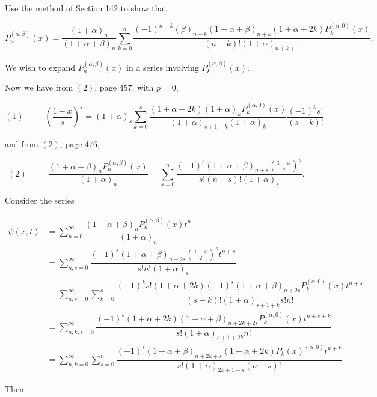 \begin{problem}\label{problem5chapter16}
Use the method of Section 142 to show that

$$P_n^{(\alpha,\beta)}(x) = \dfrac{(1+\alpha)_n}{(1+\alpha+\beta)_n} \displaystyle\sum_{k=0}^n \dfrac{(-1)^{n-k}(\beta)_{n-k}(1+\alpha+\beta)_{n+k}(1+\alpha+2k)P_k^{(\alpha,0)}(x)}{(n-k)! (1+\alpha)_{n+k+1}}.$$
\end{problem}
\begin{solution}
We wish to expand $P_n^{(\alpha,\beta)}(x)$ in a series involving $P_k^{(\alpha,\beta)}(x).$

Now we have from $(2)$, page 457, with $p=0$,

$$(1) \hspace{30pt} \left( \dfrac{1-x}{s} \right)^s = (1+\alpha)_s \displaystyle\sum_{k=0}^s \dfrac{(1+\alpha+2k)(1+\alpha)_k P_k^{(\alpha,0)}(x)}{(1+\alpha)_{s+1+k} (1+\alpha)_k} \dfrac{(-1)^k s!}{(s-k)!}$$

and from $(2)$, page 476,

$$(2) \hspace{30pt} \dfrac{(1+\alpha+\beta)_n P_n^{(\alpha,\beta)}(x)}{(1+\alpha)_n} = \displaystyle\sum_{s=0}^n \dfrac{(-1)^s (1+\alpha+\beta)_{n+s} (\frac{1-x}{s})^s}{s! (n-s)! (1+\alpha)_s}.$$

Consider the series

$$\begin{array}{ll}
\psi(x,t) &= \displaystyle\sum_{n=0}^{\infty} \dfrac{(1+\alpha+\beta)_n P_n^{(\alpha,\beta)}(x) t^n}{(1+\alpha)_n} \\
&= \displaystyle\sum_{n,s=0}^{\infty} \dfrac{(-1)^s (1+\alpha+\beta)_{n+2s} (\frac{1-x}{2})^s t^{n+s}}{s! n! (1+\alpha)_s} \\
&= \displaystyle\sum_{n,s=0}^{\infty} \displaystyle\sum_{k=0}^s \dfrac{(-1)^k s! (1+\alpha+2k)(-1)^s (1+\alpha+\beta)_{n+2s}P_k^{(\alpha,0)}(x) t^{n+s}}{(s-k)! (1+\alpha)_{s+1+k} s! n!} \\
&= \displaystyle\sum_{n,k,s=0}^{\infty} \dfrac{(-1)^s (1+\alpha+2k)(1+\alpha+\beta)_{n+2k+2s}P_k^{(\alpha,0)}(x) t^{n+s+k}}{s! (1+\alpha)_{s+1+2k}n!} \\
&= \displaystyle\sum_{n,k=0}^{\infty} \displaystyle\sum_{s=0}^n \dfrac{(-1)^s (1+\alpha+\beta)_{n+2k+s} (1+\alpha+2k) P_k(x)^{(\alpha,0)} t^{n+k}}{s! (1+\alpha)_{2k+1+s}(n-s)!}
\end{array}$$

Then


\end{solution}
